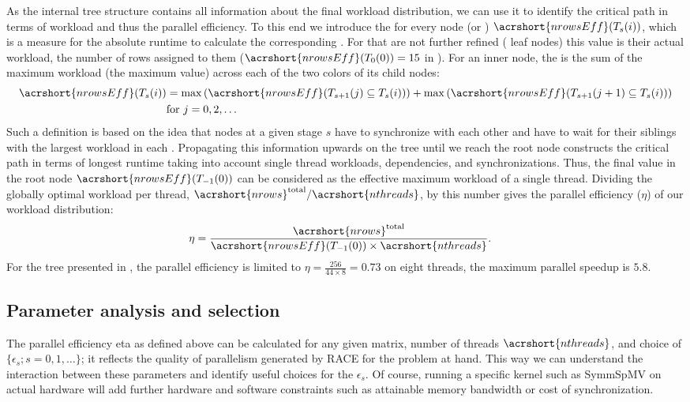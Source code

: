 As the internal tree structure contains all information about the
final workload distribution, we can use it to identify the critical
path in terms of workload and thus  the parallel
efficiency. To this end we introduce the \effRow for every node
(or \levelGroup) $\acrshort{nrowsEff}(T_s(i))$, which is a measure for
the absolute runtime to calculate the
corresponding \levelGroup. For \levelGroups that are not further
refined ( leaf nodes) this value is their actual workload, \ie the
number of rows assigned to them ($\acrshort{nrowsEff}(T_0(0)) = 15$
in ). For an inner node, the \effRow is the
sum of the maximum workload (\ie the maximum \effRow value) across each of
the two colors of its child nodes:
\begin{align*}
\acrshort{nrowsEff}(T_s(i)) &= \max\left(\acrshort{nrowsEff}(T_{s+1}(j) \subseteq T_s(i))\right) + \max\left(\acrshort{nrowsEff}(T_{s+1}(j+1) \subseteq T_s(i))\right)\\
 & \text{for } j=0,2,\ldots
\end{align*}
Such a definition is based on the idea that nodes at a given stage $s$
have to synchronize with each other and have to wait for their
siblings with the largest workload in each  . Propagating
this information upwards on the tree until we reach the root node
constructs the critical path in terms of longest runtime taking into
account single thread workloads, dependencies, and
synchronizations. Thus, the final value in the root node
$\acrshort{nrowsEff}(T_{-1}(0))$ can be considered as the effective
maximum workload of a single thread. Dividing the globally optimal
workload per thread,
${\acrshort{nrows}^\mathrm{total}}/{\acrshort{nthreads}}$, by
this number gives the parallel efficiency ($\eta$) of our workload
distribution:
\begin{align*}
	\eta &= \frac{ \acrshort{nrows}^\mathrm{total}} {\acrshort{nrowsEff}(T_{-1}(0)) \times \acrshort{nthreads}}. 
\end{align*}
For the tree presented in , the parallel
efficiency is limited to $\eta=\frac{256}{44 \times 8 } = 0.73$ on
eight threads, \ie the maximum parallel speedup is $5.8$.

\subsection{Parameter analysis and selection}
\label{subsec:param_analysis}
The parallel efficiency \acrshort{eta} as defined above can be calculated for
any given matrix, number of threads $\acrshort{nthreads}$, and choice of
$\{\epsilon_s; s=0,1,\ldots\}$; it reflects the quality of parallelism generated
by \acrshort{RACE} for the problem at hand.  This way we can understand the
interaction between these parameters and identify useful choices for
the $\epsilon_s$. Of course, running a specific kernel such
as \acrshort{SymmSpMV} on actual hardware will add further hardware and software
constraints such as attainable memory bandwidth or cost of synchronization.

